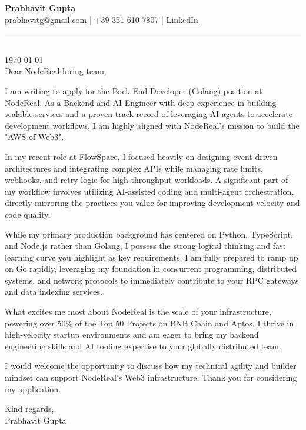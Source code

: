 \documentclass[11pt,a4paper]{article}
\begin{document}
{\Large \textbf{Prabhavit Gupta}} \\[1ex]
\href{mailto:prabhavitg@gmail.com}{prabhavitg@gmail.com} | +39 351 610 7807 | \href{https://www.linkedin.com/in/prabhavit/}{LinkedIn} \\[2ex]
\noindent\rule{\textwidth}{0.4pt} \\[2ex]

\today \\[2ex]

Dear NodeReal hiring team,

I am writing to apply for the Back End Developer (Golang) position at NodeReal. As a Backend and AI Engineer with deep experience in building scalable services and a proven track record of leveraging AI agents to accelerate development workflows, I am highly aligned with NodeReal's mission to build the "AWS of Web3".

In my recent role at FlowSpace, I focused heavily on designing event-driven architectures and integrating complex APIs while managing rate limits, webhooks, and retry logic for high-throughput workloads. A significant part of my workflow involves utilizing AI-assisted coding and multi-agent orchestration, directly mirroring the practices you value for improving development velocity and code quality. 

While my primary production background has centered on Python, TypeScript, and Node.js rather than Golang, I possess the strong logical thinking and fast learning curve you highlight as key requirements. I am fully prepared to ramp up on Go rapidly, leveraging my foundation in concurrent programming, distributed systems, and network protocols to immediately contribute to your RPC gateways and data indexing services.

What excites me most about NodeReal is the scale of your infrastructure, powering over 50\% of the Top 50 Projects on BNB Chain and Aptos. I thrive in high-velocity startup environments and am eager to bring my backend engineering skills and AI tooling expertise to your globally distributed team.

I would welcome the opportunity to discuss how my technical agility and builder mindset can support NodeReal's Web3 infrastructure. Thank you for considering my application.

\begin{flushright}
Kind regards, \\[3ex]

Prabhavit Gupta
\end{flushright}
\end{document}
